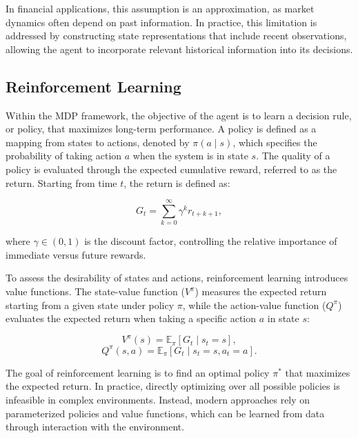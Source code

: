 \documentclass[]{elsarticle}
\begin{document}
In financial applications, this assumption is an approximation, as market dynamics often depend on past information. In practice, this limitation is addressed by constructing state representations that include recent observations, allowing the agent to incorporate relevant historical information into its decisions.

\hypertarget{Reinforcement-Learning}{%
\subsection{Reinforcement Learning}\label{Reinforcement-Learning}}

Within the MDP framework, the objective of the agent is to learn a decision rule, or policy, that maximizes long-term performance. A policy is defined as a mapping from states to actions, denoted by \(\pi(a \mid s)\), which specifies the probability of taking action \(a\) when the system is in state \(s\). The quality of a policy is evaluated through the expected cumulative reward, referred to as the return. Starting from time \(t\), the return is defined as:

\begin{equation}
G_t = \sum_{k=0}^{\infty} \gamma^k r_{t+k+1},
\end{equation}

where \(\gamma \in (0,1)\) is the discount factor, controlling the relative importance of immediate versus future rewards.

To assess the desirability of states and actions, reinforcement learning introduces value functions. The state-value function (\(V^\pi\)) measures the expected return starting from a given state under policy \(\pi\), while the action-value function (\(Q^\pi\)) evaluates the expected return when taking a specific action \(a\) in state \(s\):

\begin{equation}
V^\pi(s) = \mathbb{E}_\pi \left[ G_t \mid s_t = s \right],
\end{equation}
\begin{equation}
Q^\pi(s,a) = \mathbb{E}_\pi \left[ G_t \mid s_t = s, a_t = a \right].
\end{equation}

The goal of reinforcement learning is to find an optimal policy \(\pi^*\) that maximizes the expected return. In practice, directly optimizing over all possible policies is infeasible in complex environments. Instead, modern approaches rely on parameterized policies and value functions, which can be learned from data through interaction with the environment.
\end{document}
